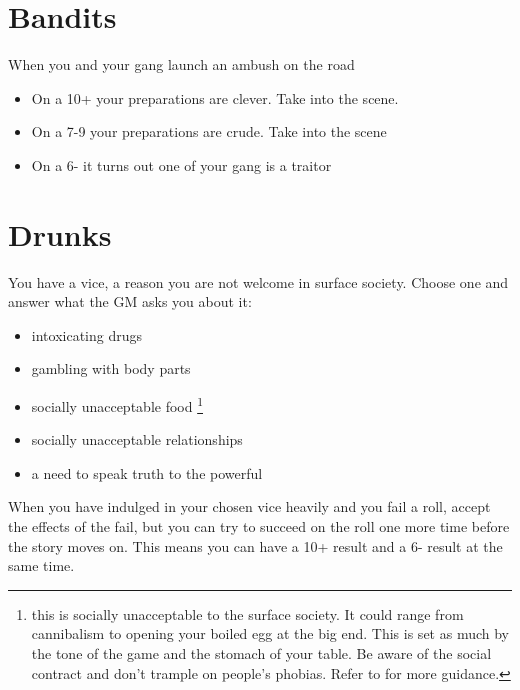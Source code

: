 \documentclass{tufte-book}
\begin{document}
\section{Bandits} 
When you and your gang launch an ambush on the road  
\begin{itemize}
\item On a 10+ your preparations are clever. Take  into the scene.
\item On a 7-9 your preparations are crude. Take  into the scene
\item On a 6- it turns out one of your gang is a traitor
\end{itemize}

\section{Drunks} 
You have a vice, a reason you are not welcome in surface society. Choose one and answer what the GM asks you about it:
\begin{itemize}
\item intoxicating drugs
\item gambling with body parts
\item socially unacceptable food \footnote{this is socially unacceptable to the surface society. It could range from cannibalism to opening your boiled egg at the big end. This is set as much by the tone of the game and the stomach of your table. Be aware of the social contract and don't trample on people's phobias. Refer to  for more guidance.}
\item socially unacceptable relationships
\item a need to speak truth to the powerful
\end{itemize}
When you have indulged in your chosen vice heavily and you fail a roll, accept the effects of the fail, but you can try to succeed on the roll one more time before the story moves on. This means you can have a 10+ result and a 6- result at the same time. 
\end{document}

